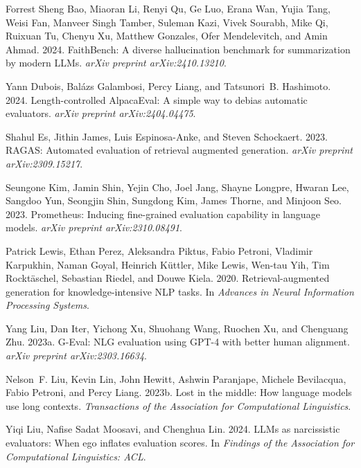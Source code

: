 \documentclass[11pt]{article}
\begin{document}
\begin{thebibliography}{}

Forrest Sheng Bao, Miaoran Li, Renyi Qu, Ge Luo, Erana Wan, Yujia Tang, Weisi Fan, Manveer Singh Tamber, Suleman Kazi, Vivek Sourabh, Mike Qi, Ruixuan Tu, Chenyu Xu, Matthew Gonzales, Ofer Mendelevitch, and Amin Ahmad. 2024.
\newblock FaithBench: A diverse hallucination benchmark for summarization by modern LLMs.
\newblock \emph{arXiv preprint arXiv:2410.13210}.

Yann Dubois, Bal{\'a}zs Galambosi, Percy Liang, and Tatsunori~B. Hashimoto. 2024.
\newblock Length-controlled AlpacaEval: A simple way to debias automatic evaluators.
\newblock \emph{arXiv preprint arXiv:2404.04475}.

Shahul Es, Jithin James, Luis Espinosa-Anke, and Steven Schockaert. 2023.
\newblock RAGAS: Automated evaluation of retrieval augmented generation.
\newblock \emph{arXiv preprint arXiv:2309.15217}.

Seungone Kim, Jamin Shin, Yejin Cho, Joel Jang, Shayne Longpre, Hwaran Lee, Sangdoo Yun, Seongjin Shin, Sungdong Kim, James Thorne, and Minjoon Seo. 2023.
\newblock Prometheus: Inducing fine-grained evaluation capability in language models.
\newblock \emph{arXiv preprint arXiv:2310.08491}.

Patrick Lewis, Ethan Perez, Aleksandra Piktus, Fabio Petroni, Vladimir Karpukhin, Naman Goyal, Heinrich K{\"u}ttler, Mike Lewis, Wen-tau Yih, Tim Rockt{\"a}schel, Sebastian Riedel, and Douwe Kiela. 2020.
\newblock Retrieval-augmented generation for knowledge-intensive NLP tasks.
\newblock In \emph{Advances in Neural Information Processing Systems}.

Yang Liu, Dan Iter, Yichong Xu, Shuohang Wang, Ruochen Xu, and Chenguang Zhu. 2023a.
\newblock G-Eval: NLG evaluation using GPT-4 with better human alignment.
\newblock \emph{arXiv preprint arXiv:2303.16634}.

Nelson~F. Liu, Kevin Lin, John Hewitt, Ashwin Paranjape, Michele Bevilacqua, Fabio Petroni, and Percy Liang. 2023b.
\newblock Lost in the middle: How language models use long contexts.
\newblock \emph{Transactions of the Association for Computational Linguistics}.

Yiqi Liu, Nafise Sadat Moosavi, and Chenghua Lin. 2024.
\newblock LLMs as narcissistic evaluators: When ego inflates evaluation scores.
\newblock In \emph{Findings of the Association for Computational Linguistics: ACL}.


\end{thebibliography}
\end{document}
